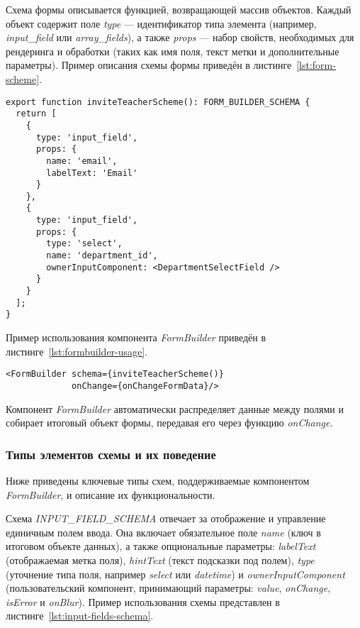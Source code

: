 Схема формы описывается функцией, возвращающей массив объектов. Каждый объект содержит поле \textit{type} — идентификатор типа элемента (например, \textit{input\_field} или \textit{array\_fields}), а также \textit{props} — набор свойств, необходимых для рендеринга и обработки (таких как имя поля, текст метки и дополнительные параметры). Пример описания схемы формы приведён в листинге~\ref{lst:form-scheme}.

\begin{lstlisting}[caption=Пример описания схемы формы,label=lst:form-scheme]
export function inviteTeacherScheme(): FORM_BUILDER_SCHEMA {
  return [
    {
      type: 'input_field',
      props: {
        name: 'email',
        labelText: 'Email'
      }
    },
    {
      type: 'input_field',
      props: {
        type: 'select',
        name: 'department_id',
        ownerInputComponent: <DepartmentSelectField />
      }
    }
  ];
}
\end{lstlisting}

Пример использования компонента \textit{FormBuilder} приведён в листинге~\ref{lst:formbuilder-usage}.

\begin{lstlisting}[caption=Использование компонента \textit{FormBuilder},label=lst:formbuilder-usage]
<FormBuilder schema={inviteTeacherScheme()} 
			 onChange={onChangeFormData}/>
\end{lstlisting}

Компонент \textit{FormBuilder} автоматически распределяет данные между полями и собирает итоговый объект формы, передавая его через функцию \textit{onChange}.

\subsubsection{Типы элементов схемы и их поведение}
Ниже приведены ключевые типы схем, поддерживаемые компонентом \textit{FormBuilder}, и описание их функциональности.

Схема \textit{INPUT\_FIELD\_SCHEMA} отвечает за отображение и управление единичным полем ввода. Она включает обязательное поле \textit{name} (ключ в итоговом объекте данных), а также опциональные параметры: \textit{labelText} (отображаемая метка поля), \textit{hintText} (текст подсказки под полем), \textit{type} (уточнение типа поля, например \textit{select} или \textit{datetime}) и \textit{ownerInputComponent} (пользовательский компонент, принимающий параметры: \textit{value}, \textit{onChange}, \textit{isError} и \textit{onBlur}). Пример использования схемы представлен в листинге~\ref{lst:input-fields-schema}.

